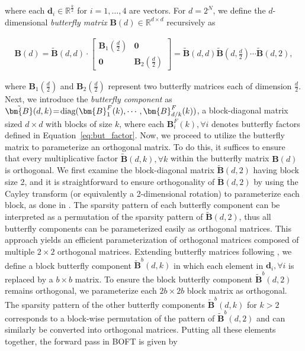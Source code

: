 where each $\bm{d}_i \in \mathbb{R}^{\frac{k}{2}}$ for $i = 1, \ldots, 4$ are vectors. For $d = 2^N$, we define the $d$-dimensional \emph{butterfly matrix} $\bm{B}(d) \in \mathbb{R}^{d \times d}$ recursively as

\begin{equation}
\begin{aligned}
    \bm{B}(d) = \tilde{\bm{B}}(d, d) \cdot \begin{bmatrix}
    \bm{B}_1(\frac{d}{2}) & \bm{0} \\
    \bm{0} & \bm{B}_2(\frac{d}{2})
    \end{bmatrix} = \tilde{\bm{B}}(d, d) \tilde{\bm{B}}(d, \frac{d}{2}) \cdots \tilde{\bm{B}}(d, 2),
\end{aligned}
\end{equation}

where $\bm{B}_1(\frac{d}{2})$ and $\bm{B}_2(\frac{d}{2})$ represent two butterfly matrices each of dimension $\frac{d}{2}$. Next, we introduce the \emph{butterfly component} as $\thickmuskip=2mu \medmuskip=2mu \tilde{\bm{B}}(d,k)=\text{diag}(\bm{B}^F_1(k),\cdots,\bm{B}^F_{d/k}(k))$, a block-diagonal matrix sized $d \times d$ with blocks of size $k$, where each $\bm{B}^F_i(k), \forall i$ denotes butterfly factors defined in Equation~\ref{eq:but_factor}. Now, we proceed to utilize the butterfly matrix to parameterize an orthogonal matrix. To do this, it suffices to ensure that every multiplicative factor $\tilde{\bm{B}}(d,k), \forall k$ within the butterfly matrix $\bm{B}(d)$ is orthogonal. We first examine the block-diagonal matrix $\tilde{\bm{B}}(d,2)$ having block size 2, and it is straightforward to ensure orthogonality of $\tilde{\bm{B}}(d,2)$ by using the Cayley transform (or equivalently a 2-dimensional rotation) to parameterize each block, as done in \cite{liu2021orthogonal,qiu2023controlling}. The sparsity pattern of each butterfly component can be interpreted as a permutation of the sparsity pattern of $\tilde{\bm{B}}(d,2)$, thus all butterfly components can be parameterized easily as orthogonal matrices. This approach yields an efficient parameterization of orthogonal matrices composed of multiple $2 \times 2$ orthogonal matrices. Extending butterfly matrices following \cite{chen2022pixelated}, we define a block butterfly component $\tilde{\bm{B}}^b(d,k)$ in which each element in $\bm{d}_i, \forall i$ is replaced by a $b \times b$ matrix. To ensure the block butterfly component $\tilde{\bm{B}}^b(d,2)$ remains orthogonal, we parameterize each $2b \times 2b$ block matrix as orthogonal. The sparsity pattern of the other butterfly components $\tilde{\bm{B}}^b(d,k)$ for $k > 2$ corresponds to a block-wise permutation of the pattern of $\tilde{\bm{B}}^b(d,2)$ and can similarly be converted into orthogonal matrices. Putting all these elements together, the forward pass in BOFT is given by


